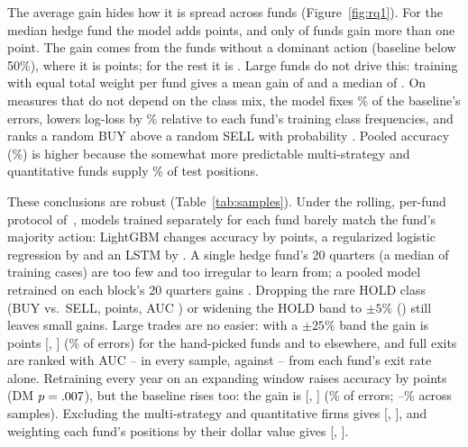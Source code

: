 The average gain hides how it is spread across funds (Figure~\ref{fig:rq1}). For the median hedge fund the model adds \medgainM{} points, and
only \naboveM{} of \activeM{} funds gain more than one point. The gain comes
from the \nlowbaseM{} funds without a dominant action (baseline below 50\%),
where it is \gainlowbaseM{} points; for the rest it is \gainrestM{}. Large
funds do not drive this: training with
equal total weight per fund gives a mean gain of \fundwtgainM{} and a median
of \fundwtmedM. On measures that do not depend on the class mix, the model fixes
\errredM\% of the baseline's errors, lowers log-loss by \llskillM\% relative
to each fund's training class frequencies, and ranks a random BUY above a
random SELL with probability \aucbsM{}. Pooled accuracy (\lgbpooledM\%) is
higher because the somewhat more predictable multi-strategy and quantitative
funds supply \multiquantshareM\% of test positions.

These conclusions are robust (Table~\ref{tab:samples}). Under the rolling,
per-fund protocol of~\cite{cohen2026mimicking}, models trained separately for
each fund barely match the fund's majority action: LightGBM changes accuracy
by \protfundgainM{} points, a regularized logistic regression by
\protlogitgainM{} and an LSTM by \protlstmgainM{}. A single hedge fund's 20
quarters (a median of \medtrainM{} training cases) are too few and too
irregular to learn from; a pooled model retrained on each block's 20 quarters
gains \protpoolgainM. Dropping the rare HOLD class (BUY vs.\ SELL, \bsgainM{}
points, AUC \bsaucM{}) or widening the HOLD band to $\pm5\%$ (\hbgainM{})
still leaves small gains. Large trades are no easier: with a
$\pm25\%$ band the gain is \bigM{} points [\bigloM, \bighiM] (\bigerrM\% of
errors) for the hand-picked funds and \bigmin{} to \bigmax{} elsewhere, and
full exits are ranked with AUC \exitaucmin--\exitaucmax{} in every sample,
against \exitbasemin--\exitbasemax{} from each fund's exit rate alone.
Retraining every year on an expanding window raises accuracy by \yrdiffM{}
points (DM $p = .007$), but the baseline rises too: the gain is \yrgainM{}
[\yrgainloM, \yrgainhiM] (\yrerrM\% of errors; \yrerrmin--\yrerrmax\% across
samples). Excluding the multi-strategy and quantitative
firms gives \exmqgain{} [\exmqlo, \exmqhi], and weighting each fund's
positions by their dollar value gives \dwgain{} [\dwlo, \dwhi]. 


